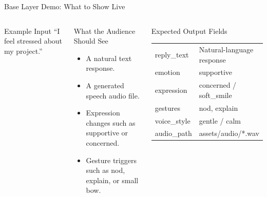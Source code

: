 \documentclass[aspectratio=169]{beamer}
\begin{document}
\begin{frame}{Base Layer Demo: What to Show Live}
  \begin{columns}[T,onlytextwidth]
    \begin{block}{Example Input}
      ``I feel stressed about my project.''
    \end{block}
    \begin{block}{What the Audience Should See}
      \begin{itemize}
        \item A natural text response.
        \item A generated speech audio file.
        \item Expression changes such as supportive or concerned.
        \item Gesture triggers such as nod, explain, or small bow.
      \end{itemize}
    \end{block}
    \begin{block}{Expected Output Fields}
      \small
      \begin{tabular}{ll}
        reply\_text & Natural-language response \\
        emotion & supportive \\
        expression & concerned / soft\_smile \\
        gestures & nod, explain \\
        voice\_style & gentle / calm \\
        audio\_path & assets/audio/*.wav \\
      \end{tabular}
    \end{block}
  \end{columns}
\end{frame}
\end{document}
